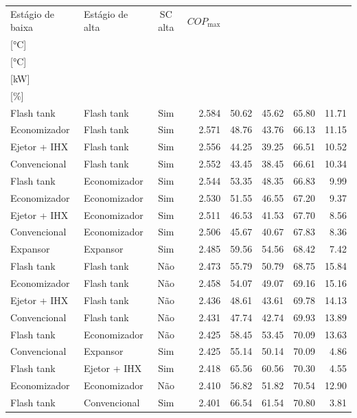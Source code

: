 {\small\setlength{\tabcolsep}{4pt}\renewcommand{\arraystretch}{1.12}
\begin{tabular}{llcrrrrr}
\toprule
Estágio de baixa & Estágio de alta & SC alta & $COP_{\max}$ & \shortstack{$T_{\mathrm{cond,l}}^*$\\{[°C]}} & \shortstack{$T_{\mathrm{evap,h}}^*$\\{[°C]}} & \shortstack{$\dot W_{\mathrm{liq}}$\\{[kW]}} & \shortstack{$\Delta COP_{\mathrm{opt}}$\\{[\%]}} \\
\midrule
Flash tank & Flash tank & Sim & 2.584 & 50.62 & 45.62 & 65.80 & 11.71 \\
Economizador & Flash tank & Sim & 2.571 & 48.76 & 43.76 & 66.13 & 11.15 \\
Ejetor + IHX & Flash tank & Sim & 2.556 & 44.25 & 39.25 & 66.51 & 10.52 \\
Convencional & Flash tank & Sim & 2.552 & 43.45 & 38.45 & 66.61 & 10.34 \\
Flash tank & Economizador & Sim & 2.544 & 53.35 & 48.35 & 66.83 & 9.99 \\
Economizador & Economizador & Sim & 2.530 & 51.55 & 46.55 & 67.20 & 9.37 \\
Ejetor + IHX & Economizador & Sim & 2.511 & 46.53 & 41.53 & 67.70 & 8.56 \\
Convencional & Economizador & Sim & 2.506 & 45.67 & 40.67 & 67.83 & 8.36 \\
Expansor & Expansor & Sim & 2.485 & 59.56 & 54.56 & 68.42 & 7.42 \\
Flash tank & Flash tank & Não & 2.473 & 55.79 & 50.79 & 68.75 & 15.84 \\
Economizador & Flash tank & Não & 2.458 & 54.07 & 49.07 & 69.16 & 15.16 \\
Ejetor + IHX & Flash tank & Não & 2.436 & 48.61 & 43.61 & 69.78 & 14.13 \\
Convencional & Flash tank & Não & 2.431 & 47.74 & 42.74 & 69.93 & 13.89 \\
Flash tank & Economizador & Não & 2.425 & 58.45 & 53.45 & 70.09 & 13.63 \\
Convencional & Expansor & Sim & 2.425 & 55.14 & 50.14 & 70.09 & 4.86 \\
Flash tank & Ejetor + IHX & Sim & 2.418 & 65.56 & 60.56 & 70.30 & 4.55 \\
Economizador & Economizador & Não & 2.410 & 56.82 & 51.82 & 70.54 & 12.90 \\
Flash tank & Convencional & Sim & 2.401 & 66.54 & 61.54 & 70.80 & 3.81 \\

\end{tabular}}
